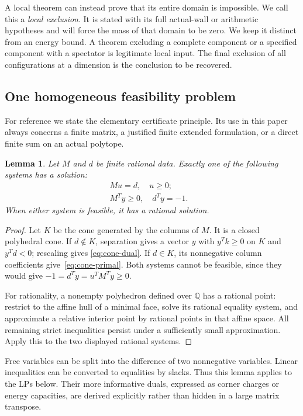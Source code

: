 \documentclass[11pt]{article}
\newtheorem{lemma}[theorem]{Lemma}
\theoremstyle{definition}
\theoremstyle{remark}
\numberwithin{equation}{section}
\newcommand{\Q}{\mathbb Q}
\begin{document}
A local theorem can instead prove that its entire domain is
impossible. We call this a \emph{local exclusion}. It is stated with
its full actual-wall or arithmetic hypotheses and will force the mass
of that domain to be zero. We keep it distinct from an energy bound.
A theorem excluding a complete component or a specified component
with a spectator is legitimate local input. The final exclusion of
all configurations at a dimension is the conclusion to be recovered.

\subsection{One homogeneous feasibility problem}

For reference we state the elementary certificate principle. Its use
in this paper always concerns a finite matrix, a justified finite
extended formulation, or a direct finite sum on an actual polytope.

\begin{lemma}\label{lem:cone-alternative}
Let $M$ and $d$ be finite rational data. Exactly one of the following
systems has a solution:
\begin{align}
 Mu=d,\quad u\ge0; &\label{eq:cone-primal}\\
 M^Ty\ge0,\quad d^Ty=-1. &\label{eq:cone-dual}
\end{align}
When either system is feasible, it has a rational solution.
\end{lemma}
\begin{proof}
Let $K$ be the cone generated by the columns of $M$. It is a closed
polyhedral cone. If $d\notin K$, separation gives a vector $y$ with
$y^Tk\ge0$ on $K$ and $y^Td<0$; rescaling gives
\eqref{eq:cone-dual}. If $d\in K$, its nonnegative column
coefficients give~\eqref{eq:cone-primal}. Both systems cannot be
feasible, since they would give
$-1=d^Ty=u^TM^Ty\ge0$.

For rationality, a nonempty polyhedron defined over $\Q$ has a
rational point: restrict to the affine hull of a minimal face,
solve its rational equality system, and approximate a relative
interior point by rational points in that affine space. All remaining
strict inequalities persist under a sufficiently small approximation.
Apply this to the two displayed rational systems.
\end{proof}

Free variables can be split into the difference of two nonnegative
variables. Linear inequalities can be converted to equalities by
slacks. Thus this lemma applies to the LPs below. Their more informative
duals, expressed as corner charges or energy capacities, are derived
explicitly rather than hidden in a large matrix transpose.
\end{document}
